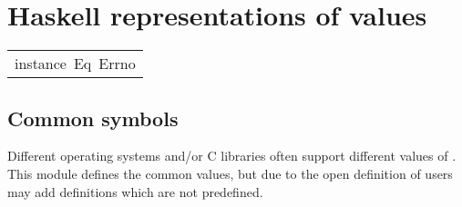 \section{Haskell representations of  values
}
\begin{haddockdesc}
\item[\begin{tabular}{@{}l}
instance\ Eq\ Errno
\end{tabular}]
\end{haddockdesc}
\subsection{Common  symbols
}
Different operating systems and/or C libraries often support
 different values of .  This module defines the common values,
 but due to the open definition of  users may add definitions
 which are not predefined.
\par

